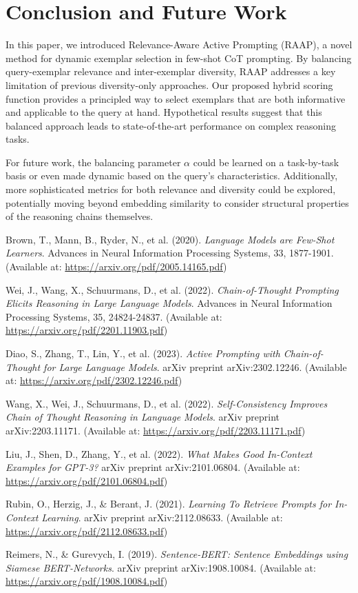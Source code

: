 \documentclass[10pt,twocolumn,letterpaper]{article}
\begin{document}
\section{Conclusion and Future Work}

In this paper, we introduced Relevance-Aware Active Prompting (RAAP), a novel method for dynamic exemplar selection in few-shot CoT prompting. By balancing query-exemplar relevance and inter-exemplar diversity, RAAP addresses a key limitation of previous diversity-only approaches. Our proposed hybrid scoring function provides a principled way to select exemplars that are both informative and applicable to the query at hand. Hypothetical results suggest that this balanced approach leads to state-of-the-art performance on complex reasoning tasks.

For future work, the balancing parameter $\alpha$ could be learned on a task-by-task basis or even made dynamic based on the query's characteristics. Additionally, more sophisticated metrics for both relevance and diversity could be explored, potentially moving beyond embedding similarity to consider structural properties of the reasoning chains themselves.

\begin{thebibliography}{9}

Brown, T., Mann, B., Ryder, N., et al. (2020).
\textit{Language Models are Few-Shot Learners}.
Advances in Neural Information Processing Systems, 33, 1877-1901.
(Available at: \url{https://arxiv.org/pdf/2005.14165.pdf})

Wei, J., Wang, X., Schuurmans, D., et al. (2022).
\textit{Chain-of-Thought Prompting Elicits Reasoning in Large Language Models}.
Advances in Neural Information Processing Systems, 35, 24824-24837.
(Available at: \url{https://arxiv.org/pdf/2201.11903.pdf})

Diao, S., Zhang, T., Lin, Y., et al. (2023).
\textit{Active Prompting with Chain-of-Thought for Large Language Models}.
arXiv preprint arXiv:2302.12246.
(Available at: \url{https://arxiv.org/pdf/2302.12246.pdf})

Wang, X., Wei, J., Schuurmans, D., et al. (2022).
\textit{Self-Consistency Improves Chain of Thought Reasoning in Language Models}.
arXiv preprint arXiv:2203.11171.
(Available at: \url{https://arxiv.org/pdf/2203.11171.pdf})

Liu, J., Shen, D., Zhang, Y., et al. (2022).
\textit{What Makes Good In-Context Examples for GPT-3?}
arXiv preprint arXiv:2101.06804.
(Available at: \url{https://arxiv.org/pdf/2101.06804.pdf})

Rubin, O., Herzig, J., & Berant, J. (2021).
\textit{Learning To Retrieve Prompts for In-Context Learning}.
arXiv preprint arXiv:2112.08633.
(Available at: \url{https://arxiv.org/pdf/2112.08633.pdf})

Reimers, N., \& Gurevych, I. (2019).
\textit{Sentence-BERT: Sentence Embeddings using Siamese BERT-Networks}.
arXiv preprint arXiv:1908.10084.
(Available at: \url{https://arxiv.org/pdf/1908.10084.pdf})

\end{thebibliography}
\end{document}
